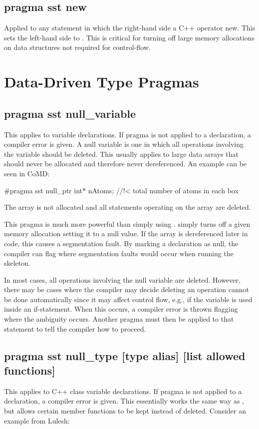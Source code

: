 \subsection{pragma sst new}
Applied to any statement in which the right-hand side a C++ operator new. This sets the left-hand side to .
This is critical for turning off large memory allocations on data structures not required for control-flow.

\section{Data-Driven Type Pragmas}
\subsection{pragma sst null\_variable}
This applies to variable declarations. If pragma is not applied to a declaration, a compiler error is given.
A null variable is one in which all operations involving the variable should be deleted.
This usually applies to large data arrays that should never be allocated and therefore never dereferenced.
An example can be seen in CoMD:

\begin{CppCode}
#pragma sst null_ptr
   int* nAtoms;         //!< total number of atoms in each box
\end{CppCode}
The array is not allocated and all statements operating on the array are deleted.

This pragma is much more powerful than simply using .
 simply turns off a given memory allocation setting it to a null value.
If the array is dereferenced later in code, this causes a segmentation fault.
By marking a declaration as null, the compiler can flag where segmentation faults would occur when running the skeleton.

In most cases, all operations involving the null variable are deleted.
However, there may be cases where the compiler may decide deleting an operation cannot be done automatically since
it may affect control flow, e.g., if the variable is used inside an if-statement.
When this occurs, a compiler error is thrown flagging where the ambiguity occurs.
Another pragma must then be applied to that statement to tell the compiler how to proceed.

\subsection{pragma sst null\_type [type alias] [list allowed functions]}
This applies to C++ class variable declarations. If pragma is not applied to a declaration, a compiler error is given.
This essentially works the same way as , but allows certain member functions to be kept instead of deleted.
Consider an example from Lulesh:

